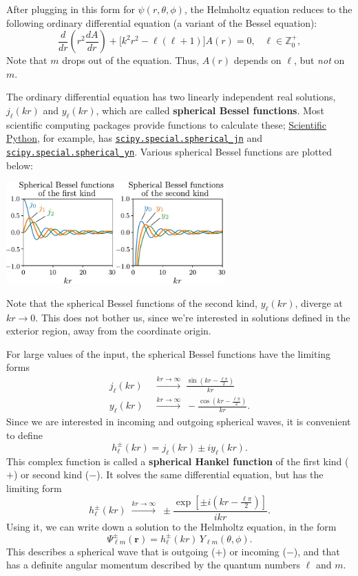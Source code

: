 \documentclass[pra,12pt]{revtex4}
\begin{document}
After plugging in this form for $\psi(r,\theta,\phi)$, the Helmholtz
equation reduces to the following ordinary differential equation (a
variant of the Bessel equation):
$$\frac{d}{dr}\left(r^2\frac{dA}{dr}\right) + \Big[k^2r^2 - \ell(\ell+1)\Big] A(r) = 0, \;\;\;\ell \in \mathbb{Z}_0^+,$$
Note that $m$ drops out of the equation.  Thus, $A(r)$ depends on
$\ell$, but \textit{not} on $m$.

The ordinary differential equation has two linearly independent real
solutions, $j_\ell(kr)$ and $y_\ell(kr)$, which are called
\textbf{spherical Bessel functions}.  Most scientific computing
packages provide functions to calculate these;
\href{https://scipy.org/}{Scientific Python}, for example, has
\href{https://docs.scipy.org/doc/scipy/reference/generated/scipy.special.spherical_jn.html}{\texttt{scipy.special.spherical\_jn}}
and
\href{https://docs.scipy.org/doc/scipy/reference/generated/scipy.special.spherical_yn.html}{\texttt{scipy.special.spherical\_yn}}.
Various spherical Bessel functions are plotted below:

\vskip 0.5cm
\begin{center}
  \includegraphics[width=0.63\textwidth]{spherical_bessel}
\end{center}

Note that the spherical Bessel functions of the second kind,
$y_\ell(kr)$, diverge at $kr\rightarrow 0$.  This does not bother us,
since we're interested in solutions defined in the exterior region,
away from the coordinate origin.

For large values of the input, the spherical Bessel functions have the
limiting forms
$$\begin{aligned}j_\ell(kr)\; &\overset{kr\rightarrow\infty}{\longrightarrow} \; \frac{\sin(kr-\frac{\ell\pi}{2})}{kr} \\ y_\ell(kr)\; &\overset{kr\rightarrow\infty}{\longrightarrow} \; - \frac{\cos(kr-\frac{\ell\pi}{2})}{kr}.\end{aligned}$$
Since we are interested in incoming and outgoing spherical waves, it
is convenient to define
$$h_\ell^\pm(kr) = j_\ell(kr) \pm i y_\ell(kr).$$
This complex function is called a \textbf{spherical Hankel function}
of the first kind ($+$) or second kind ($-$).  It solves the same
differential equation, but has the limiting form
$$h_\ell^\pm(kr)\; \overset{kr\rightarrow\infty}{\longrightarrow} \; \pm \frac{\exp\left[\pm i(kr-\frac{\ell\pi}{2})\right]}{ikr}.$$
Using it, we can write down a solution to the Helmholtz equation, in
the form
$$\Psi_{\ell m}^\pm(\mathbf{r}) = h_{\ell}^\pm(kr) \,Y_{\ell m}(\theta,\phi).$$
This describes a spherical wave that is outgoing ($+$) or incoming
($-$), and that has a definite angular momentum described by the
quantum numbers $\ell$ and $m$.
\end{document}
